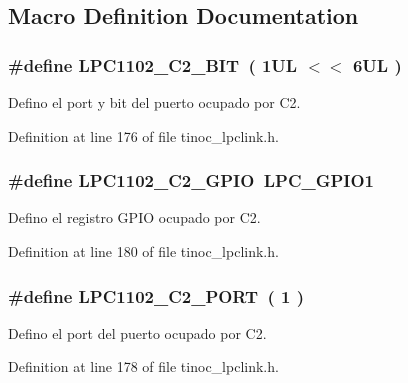 \subsection{Macro Definition Documentation}
\subsubsection[{\texorpdfstring{L\+P\+C1102\+\_\+\+C2\+\_\+\+B\+IT}{LPC1102_C2_BIT}}]{\setlength{\rightskip}{0pt plus 5cm}\#define L\+P\+C1102\+\_\+\+C2\+\_\+\+B\+IT~( 1\+U\+L $<$$<$ 6\+U\+L )}\hypertarget{group___p_i_n_c2_gabce4949f6b4b70f2239eb55ac429559b}{}\label{group___p_i_n_c2_gabce4949f6b4b70f2239eb55ac429559b}


Defino el port y bit del puerto ocupado por C2. 



Definition at line 176 of file tinoc\+\_\+lpclink.\+h.

\subsubsection[{\texorpdfstring{L\+P\+C1102\+\_\+\+C2\+\_\+\+G\+P\+IO}{LPC1102_C2_GPIO}}]{\setlength{\rightskip}{0pt plus 5cm}\#define L\+P\+C1102\+\_\+\+C2\+\_\+\+G\+P\+IO~L\+P\+C\+\_\+\+G\+P\+I\+O1}\hypertarget{group___p_i_n_c2_ga88c5ae9982021d59bd43dc9b9b22d1b9}{}\label{group___p_i_n_c2_ga88c5ae9982021d59bd43dc9b9b22d1b9}


Defino el registro G\+P\+IO ocupado por C2. 



Definition at line 180 of file tinoc\+\_\+lpclink.\+h.

\subsubsection[{\texorpdfstring{L\+P\+C1102\+\_\+\+C2\+\_\+\+P\+O\+RT}{LPC1102_C2_PORT}}]{\setlength{\rightskip}{0pt plus 5cm}\#define L\+P\+C1102\+\_\+\+C2\+\_\+\+P\+O\+RT~( 1 )}\hypertarget{group___p_i_n_c2_ga50df256c7cdc2b746d468ab4ce10df85}{}\label{group___p_i_n_c2_ga50df256c7cdc2b746d468ab4ce10df85}


Defino el port del puerto ocupado por C2. 



Definition at line 178 of file tinoc\+\_\+lpclink.\+h.


